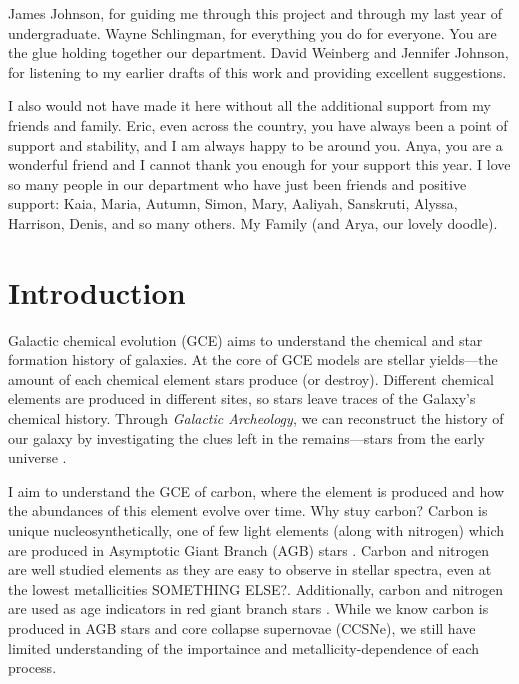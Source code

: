 \documentclass[12pt,oneside]{report}
\begin{document}
James Johnson, for guiding me through this project and through my last year of undergraduate.
Wayne Schlingman, for everything you do for everyone. You are the glue holding together our department.
David Weinberg and Jennifer Johnson, for listening to my earlier drafts of this work and providing excellent suggestions.

I also would not have made it here without all the additional support from my friends and family. Eric, even across the country, you have always been a point of support and stability, and I am always happy to be around you. Anya, you are a wonderful friend and I cannot thank you enough for your support this year. 
I love so many people in our department who have just been friends and positive support: Kaia, Maria, Autumn, Simon, Mary, Aaliyah, Sanskruti, Alyssa, Harrison, Denis, and so many others. 
My Family (and Arya, our lovely doodle).


\tableofcontents
\listoffigures
\listoftables
\newpage
{}



\chapter{Introduction}

Galactic chemical evolution (GCE) aims to understand the chemical and star formation history of galaxies. At the core of GCE models are stellar yields---the amount of each chemical element stars produce (or destroy). Different chemical elements are produced in different sites, so stars leave traces of the Galaxy's chemical history. Through \textit{Galactic Archeology}, we can reconstruct the history of our galaxy by investigating the clues left in the remains---stars from the early universe \citep{Weinberg+22, emily+19}.

I aim to understand the GCE of carbon, where the element is produced and how the abundances of this element evolve over time. Why stuy carbon? Carbon is unique nucleosynthetically, one of few light elements (along with nitrogen) which are produced in Asymptotic Giant Branch (AGB) stars \citep[for example,][]{jennifer19, KL14}. Carbon and nitrogen are well studied elements as they are easy to observe in stellar spectra, even at the lowest metallicities \citep{FN15} SOMETHING ELSE?. Additionally, carbon and nitrogen are used as age indicators in red giant branch stars \citep[e.g.][]{martig16, MG15, fiorenzo+21}.
While we know carbon is produced in AGB stars and core collapse supernovae (CCSNe), we still have limited understanding of the importaince and metallicity-dependence of each process.
\end{document}
